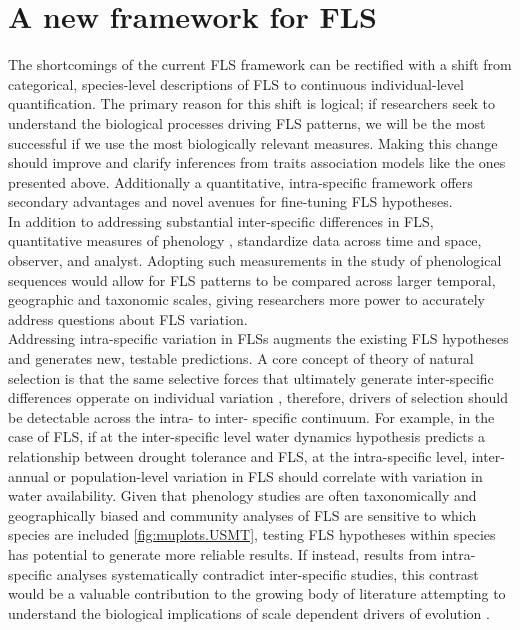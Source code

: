 \documentclass{article}
\begin{document}
\section*{A new framework for FLS}
The shortcomings of the current FLS framework can be rectified with a shift from categorical, species-level descriptions of FLS to continuous individual-level quantification. The primary reason for this shift is logical; if researchers seek to understand the biological processes driving FLS patterns, we will be the most successful if we use the most biologically relevant measures. Making this change should improve and clarify inferences from traits association models like the ones presented above. Additionally a quantitative, intra-specific framework offers secondary advantages and novel avenues for fine-tuning FLS hypotheses.\\

\noindent In addition to addressing substantial inter-specific differences in FLS, quantitative measures of phenology \citep[e.g. the BBCH scale,][]{Finn2007}, standardize data across time and space, observer, and analyst. Adopting such measurements in the study of phenological sequences would allow for FLS patterns to be compared across larger temporal, geographic and taxonomic scales, giving researchers more power to accurately address questions about FLS variation.\\

\noindent Addressing intra-specific variation in FLSs augments the existing FLS hypotheses and generates new, testable predictions. A core concept of theory of natural selection is that the same selective forces that ultimately generate inter-specific differences opperate on individual variation \citep{Dobzhansky1982, Schluter1996}, therefore, drivers of selection should be detectable across the intra- to inter- specific continuum. For example, in the case of FLS, if at the inter-specific level water dynamics hypothesis predicts a relationship between drought tolerance and FLS, at the intra-specific level, inter-annual or population-level variation in FLS should correlate with variation in water availability. Given that phenology studies are often taxonomically and geographically biased \citep{Wolkovich2014,Willis2017} and community analyses of FLS are sensitive to which species are included \ref{fig:muplots.USMT}, testing FLS hypotheses within species has potential to generate more reliable results. If instead, results from intra-specific analyses systematically contradict inter-specific studies, this contrast would be a valuable contribution to the growing body of literature attempting to understand the biological implications of scale dependent drivers of evolution \citep[e.g.,][]{Violle2012,Shipley2016,Anderegg2018}.  \\
 
\end{document}

